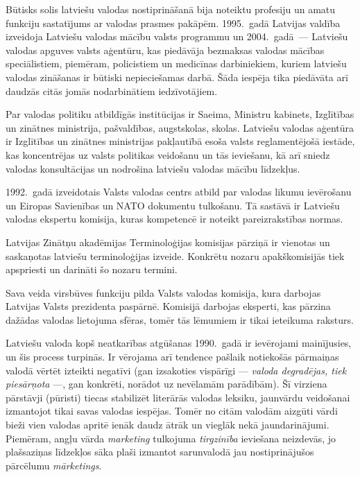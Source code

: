 \begin{multicols}{2}
Būtisks solis latviešu valodas nostiprināšanā bija noteiktu profesiju un amatu funkciju sastatījums ar valodas prasmes pakāpēm.
1995.~gadā Latvijas valdība izveidoja Latviešu valodas mācību valsts programmu un 2004.~gadā~--- Latviešu valodas apguves valsts aģentūru, kas piedāvāja bezmaksas valodas mācības speciālistiem, piemēram, policistiem un medicīnas darbiniekiem, kuriem latviešu valodas zināšanas ir būtiski nepieciešamas darbā.
Šāda iespēja tika piedāvāta arī daudzās citās jomās nodarbinātiem iedzīvotājiem.

Par valodas politiku atbildīgās institūcijas ir Saeima, Ministru kabinets, Izglītības un zinātnes ministrija, pašvaldības, augstskolas, skolas. 
Latviešu valodas aģentūra ir Izglītības un zinātnes ministrijas pakļautībā esoša valsts reglamentējošā iestāde, kas koncentrējas uz valsts politikas veidošanu un tās ieviešanu, kā arī sniedz valodas konsultācijas un nodrošina latviešu valodas mācību līdzekļus. 

1992.~gadā izveidotais Valsts valodas centrs atbild par valodas likumu ievērošanu un Eiropas Savienības un NATO dokumentu tulkošanu. 
Tā sastāvā ir Latviešu valodas ekspertu komisija, kuras kompetencē ir noteikt pareizrakstības normas. 

Latvijas Zinātņu akadēmijas Terminoloģijas komisijas pārziņā ir vienotas un saskaņotas latviešu terminoloģijas izveide. 
Konkrētu nozaru apakškomisijās tiek apspriesti un darināti šo nozaru termini.

Sava veida virsbūves funkciju pilda Valsts valodas komisija, kura darbojas Latvijas Valsts prezidenta paspārnē. 
Komisijā darbojas eksperti, kas pārzina dažādas valodas lietojuma sfēras, tomēr tās lēmumiem ir tikai ieteikuma raksturs. 

Latviešu valoda kopš neatkarības atgūšanas 1990.~gadā ir ievērojami mainījusies, un šis process turpinās.  Ir \mbox{vērojama} arī tendence pašlaik notiekošās pārmaiņas valodā vērtēt izteikti negatīvi (gan izsakoties vispārīgi --- \textit{valoda degradējas, tiek piesārņota} ---, gan konkrēti, norādot uz nevēlamām parādībām).  Šī virziena pārstāvji (pūristi) tiecas stabilizēt literārās valodas leksiku, jaunvārdu veidošanai izmantojot tikai savas valodas iespējas.  Tomēr no citām valodām aizgūti vārdi bieži vien valodas apritē ienāk daudz ātrāk un vieglāk nekā jaundarinājumi.  Piemēram, angļu vārda \textit{marketing} tulkojuma \textit{tirgzinība} ieviešana neizdevās, jo plašsaziņas līdzekļos sāka plaši izmantot sarunvalodā jau nostiprinājušos pārcēlumu \textit{mārketings}.


\end{multicols}
